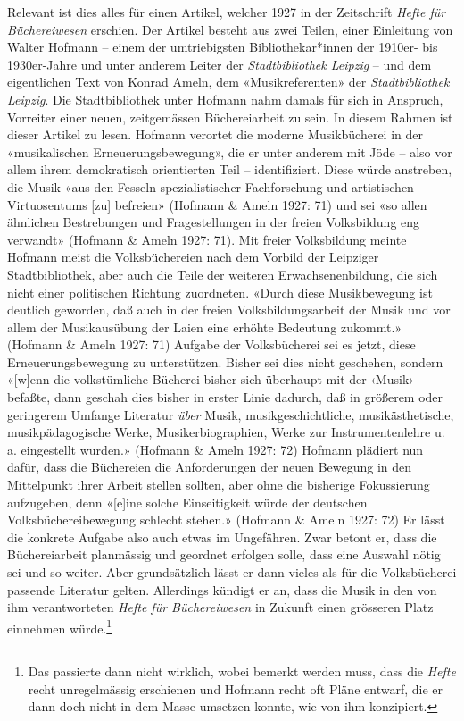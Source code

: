 \documentclass[a4paper,
fontsize=11pt,
oneside,
numbers=noperiodatend,
parskip=half-,
bibliography=totoc,
final
]{scrartcl}
\begin{document}
Relevant ist dies alles für einen Artikel, welcher 1927 in der
Zeitschrift \emph{Hefte für Büchereiwesen} erschien. Der Artikel besteht
aus zwei Teilen, einer Einleitung von Walter Hofmann -- einem der
umtriebigsten Bibliothekar*innen der 1910er- bis 1930er-Jahre und unter
anderem Leiter der \emph{Stadtbibliothek Leipzig} -- und dem
eigentlichen Text von Konrad Ameln, dem «Musikreferenten» der
\emph{Stadtbibliothek Leipzig}. Die Stadtbibliothek unter Hofmann nahm
damals für sich in Anspruch, Vorreiter einer neuen, zeitgemässen
Büchereiarbeit zu sein. In diesem Rahmen ist dieser Artikel zu lesen.
Hofmann verortet die moderne Musikbücherei in der «musikalischen
Erneuerungsbewegung», die er unter anderem mit Jöde -- also vor allem
ihrem demokratisch orientierten Teil -- identifiziert. Diese würde
anstreben, die Musik «aus den Fesseln spezialistischer Fachforschung und
artistischen Virtuosentums {[}zu{]} befreien» (Hofmann \& Ameln 1927:
71) und sei «so allen ähnlichen Bestrebungen und Fragestellungen in der
freien Volksbildung eng verwandt» (Hofmann \& Ameln 1927: 71). Mit
freier Volksbildung meinte Hofmann meist die Volksbüchereien nach dem
Vorbild der Leipziger Stadtbibliothek, aber auch die Teile der weiteren
Erwachsenenbildung, die sich nicht einer politischen Richtung
zuordneten. «Durch diese Musikbewegung ist deutlich geworden, daß auch
in der freien Volksbildungsarbeit der Musik und vor allem der
Musikausübung der Laien eine erhöhte Bedeutung zukommt.» (Hofmann \&
Ameln 1927: 71) Aufgabe der Volksbücherei sei es jetzt, diese
Erneuerungsbewegung zu unterstützen. Bisher sei dies nicht geschehen,
sondern «{[}w{]}enn die volkstümliche Bücherei bisher sich überhaupt mit
der ‹Musik› befaßte, dann geschah dies bisher in erster Linie dadurch,
daß in größerem oder geringerem Umfange Literatur \emph{über} Musik,
musikgeschichtliche, musikästhetische, musikpädagogische Werke,
Musikerbiographien, Werke zur Instrumentenlehre u. a. eingestellt
wurden.» (Hofmann \& Ameln 1927: 72) Hofmann plädiert nun dafür, dass
die Büchereien die Anforderungen der neuen Bewegung in den Mittelpunkt
ihrer Arbeit stellen sollten, aber ohne die bisherige Fokussierung
aufzugeben, denn «{[}e{]}ine solche Einseitigkeit würde der deutschen
Volksbüchereibewegung schlecht stehen.» (Hofmann \& Ameln 1927: 72) Er
lässt die konkrete Aufgabe also auch etwas im Ungefähren. Zwar betont
er, dass die Büchereiarbeit planmässig und geordnet erfolgen solle, dass
eine Auswahl nötig sei und so weiter. Aber grundsätzlich lässt er dann
vieles als für die Volksbücherei passende Literatur gelten. Allerdings
kündigt er an, dass die Musik in den von ihm verantworteten \emph{Hefte
für Büchereiwesen} in Zukunft einen grösseren Platz einnehmen
würde.\footnote{Das passierte dann nicht wirklich, wobei bemerkt werden
  muss, dass die \emph{Hefte} recht unregelmässig erschienen und Hofmann
  recht oft Pläne entwarf, die er dann doch nicht in dem Masse umsetzen
  konnte, wie von ihm konzipiert.}
\end{document}
